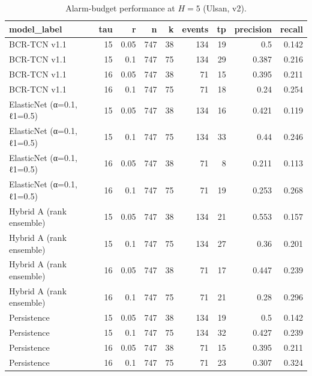 \begin{table}[htbp]
\centering
\caption{Alarm-budget performance at $H=5$ (Ulsan, v2).}
\label{tab:alarm_budget_h5_v2_long}
\begin{tabular}{lrrrrrrrr}
\hline
model_label & tau & r & n & k & events & tp & precision & recall \\
\hline
BCR-TCN v1.1 & 15 & 0.05 & 747 & 38 & 134 & 19 & 0.5 & 0.142 \\
BCR-TCN v1.1 & 15 & 0.1 & 747 & 75 & 134 & 29 & 0.387 & 0.216 \\
BCR-TCN v1.1 & 16 & 0.05 & 747 & 38 & 71 & 15 & 0.395 & 0.211 \\
BCR-TCN v1.1 & 16 & 0.1 & 747 & 75 & 71 & 18 & 0.24 & 0.254 \\
ElasticNet (α=0.1, ℓ1=0.5) & 15 & 0.05 & 747 & 38 & 134 & 16 & 0.421 & 0.119 \\
ElasticNet (α=0.1, ℓ1=0.5) & 15 & 0.1 & 747 & 75 & 134 & 33 & 0.44 & 0.246 \\
ElasticNet (α=0.1, ℓ1=0.5) & 16 & 0.05 & 747 & 38 & 71 & 8 & 0.211 & 0.113 \\
ElasticNet (α=0.1, ℓ1=0.5) & 16 & 0.1 & 747 & 75 & 71 & 19 & 0.253 & 0.268 \\
Hybrid A (rank ensemble) & 15 & 0.05 & 747 & 38 & 134 & 21 & 0.553 & 0.157 \\
Hybrid A (rank ensemble) & 15 & 0.1 & 747 & 75 & 134 & 27 & 0.36 & 0.201 \\
Hybrid A (rank ensemble) & 16 & 0.05 & 747 & 38 & 71 & 17 & 0.447 & 0.239 \\
Hybrid A (rank ensemble) & 16 & 0.1 & 747 & 75 & 71 & 21 & 0.28 & 0.296 \\
Persistence & 15 & 0.05 & 747 & 38 & 134 & 19 & 0.5 & 0.142 \\
Persistence & 15 & 0.1 & 747 & 75 & 134 & 32 & 0.427 & 0.239 \\
Persistence & 16 & 0.05 & 747 & 38 & 71 & 15 & 0.395 & 0.211 \\
Persistence & 16 & 0.1 & 747 & 75 & 71 & 23 & 0.307 & 0.324 \\
\hline
\end{tabular}
\end{table}